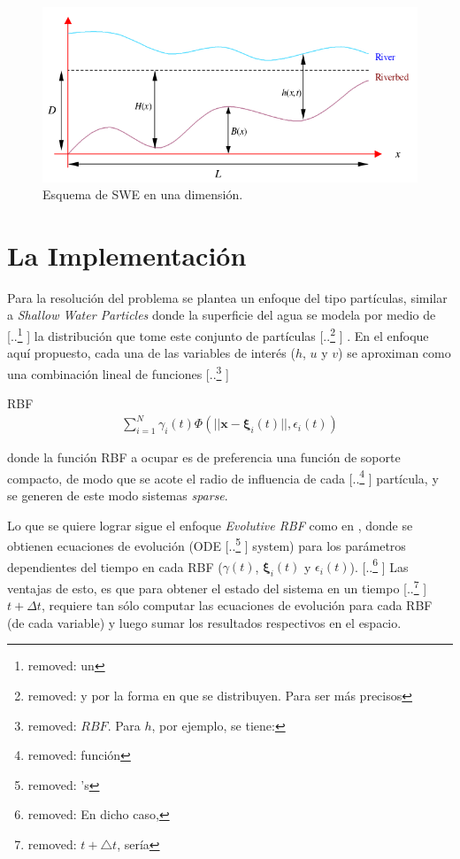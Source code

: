 \documentclass[spanish]{article} %
\providecommand{\DIFaddtex}[1]{{\protect\color{blue} \sf #1}} %
\providecommand{\DIFdeltex}[1]{{\protect\color{red} [..\footnote{removed: #1} ]}} %
\providecommand{\DIFaddbegin}{} %
\providecommand{\DIFaddend}{} %
\providecommand{\DIFdelbegin}{} %
\providecommand{\DIFdelend}{} %
\providecommand{\DIFadd}[1]{\texorpdfstring{\DIFaddtex{#1}}{#1}} %
\providecommand{\DIFdel}[1]{\texorpdfstring{\DIFdeltex{#1}}{}} %
\begin{document}
\begin{figure}[htpb!]
\centering
\includegraphics[scale=0.6]{schematic.png}
\caption{Esquema de SWE en una dimensión.}
\end{figure}

\section{La Implementación}
Para la resolución del problema se plantea un enfoque del tipo partículas, \DIFaddbegin \DIFadd{similar a \textit{Shallow Water Particles} \cite{swp} }\DIFaddend donde la superficie del agua se modela por medio de \DIFdelbegin \DIFdel{un }\DIFdelend \DIFaddbegin \DIFadd{la distribución que tome este }\DIFaddend conjunto de partículas\DIFdelbegin \DIFdel{y por la forma en que se distribuyen. Para ser más precisos}\DIFdelend \DIFaddbegin \DIFadd{. En el enfoque aquí propuesto}\DIFaddend , cada una de las variables de interés ($h$, $u$ y $v$) se aproximan como una combinación lineal de funciones \DIFdelbegin \DIFdel{$RBF$. Para $h$, por ejemplo, se tiene:
}%

\DIFdelend \DIFaddbegin \DIFadd{RBF
}\begin{align}
 \sum_{i=1}^{N} \gamma_i(t)\Phi(||\mathbf{x}-\boldsymbol{\xi}_i(t)||, \epsilon_i(t))    
\end{align}
 \DIFaddend 

\DIFaddbegin \noindent \DIFaddend donde la función RBF a ocupar es de preferencia una función de soporte compacto, de modo que se acote el radio de influencia de cada \DIFdelbegin \DIFdel{función}\DIFdelend \DIFaddbegin \DIFadd{partícula}\DIFaddend , y se generen de este modo sistemas \textit{sparse}.

Lo que se quiere lograr sigue el enfoque \textit{Evolutive RBF} \DIFaddbegin \DIFadd{como en \cite{rossi}}\DIFaddend , donde se obtienen ecuaciones de evolución (ODE \DIFdelbegin \DIFdel{'s}\DIFdelend \DIFaddbegin \DIFadd{system}\DIFaddend ) para los parámetros dependientes del tiempo en cada RBF ($\gamma(t)$, $\boldsymbol{\xi}_i(t)$ y $\epsilon_i(t)$). \DIFdelbegin \DIFdel{En dicho caso, }\DIFdelend \DIFaddbegin \DIFadd{Las ventajas de esto, es que }\DIFaddend para obtener el estado del sistema en un tiempo \DIFdelbegin \DIFdel{$t+\triangle t$, sería }\DIFdelend \DIFaddbegin \DIFadd{$t+\Delta t$, requiere }\DIFaddend tan sólo computar las ecuaciones de evolución para cada RBF (de cada variable) y luego sumar los resultados respectivos en el espacio.
\end{document}
